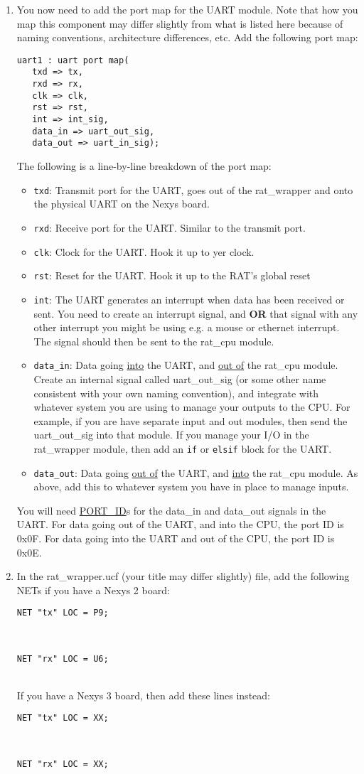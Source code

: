 \documentclass[notitlepage]{article}
\begin{document}
\begin{enumerate}
\item You now need to add the port map for the UART module. Note that how you map this component may differ slightly from what is listed here because of naming conventions, architecture differences, etc. Add the following port map:
\begin{verbatim}
uart1 : uart port map(
   txd => tx,
   rxd => rx,
   clk => clk,
   rst => rst,
   int => int_sig,
   data_in => uart_out_sig,
   data_out => uart_in_sig);
\end{verbatim}
The following is a line-by-line breakdown of the port map:
\begin{itemize}
\item \texttt{txd}: Transmit port for the UART, goes out of the rat\_wrapper and onto the physical UART on the Nexys board.
\item \texttt{rxd}: Receive port for the UART. Similar to the transmit port.
\item \texttt{clk}: Clock for the UART. Hook it up to yer clock. 
\item \texttt{rst}: Reset for the UART. Hook it up to the RAT's global reset
\item \texttt{int}: The UART generates an interrupt when data has been received or sent. You need to create an interrupt signal, and \textbf{OR} that signal with any other interrupt you might be using e.g. a mouse or ethernet interrupt. The signal should then be sent to the rat\_cpu module.
\item \texttt{data\_in}: Data going \underline{into} the UART, and \underline{out of} the rat\_cpu module. Create an internal signal called uart\_out\_sig (or some other name consistent with your own naming convention), and integrate with whatever system you are using to manage your outputs to the CPU. For example, if you are have separate input and out modules, then send the uart\_out\_sig into that module. If you manage your I/O in the rat\_wrapper module, then add an \texttt{if} or \texttt{elsif} block for the UART.
\item \texttt{data\_out}: Data going \underline{out of} the UART, and \underline{into} the rat\_cpu module. As above, add this to whatever system you have in place to manage inputs.
\end{itemize}
You will need \underline{PORT\_ID}s for the data\_in and data\_out signals in the UART. For data going out of the UART, and into the CPU, the port ID is 0x0F. For data going into the UART and out of the CPU, the port ID is 0x0E.
\item In the rat\_wrapper.ucf (your title may differ slightly) file, add the following NETs if you have a Nexys 2 board:\\
\centerline{\texttt{NET "tx" LOC = P9;}}\\
\centerline{\texttt{NET "rx" LOC = U6;}}\\
If you have a Nexys 3 board, then add these lines instead:\\
\centerline{\texttt{NET "tx" LOC = XX;}}\\
\centerline{\texttt{NET "rx" LOC = XX;}}


\end{enumerate}
\end{document}
